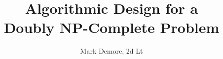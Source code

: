 \documentclass[journal]{IEEEtran}
\begin{document}
%
\title{Algorithmic Design for a\\ Doubly NP-Complete Problem}
%
%
%

\author{Mark Demore, 2d Lt}

% 
%



% 
\end{document}
